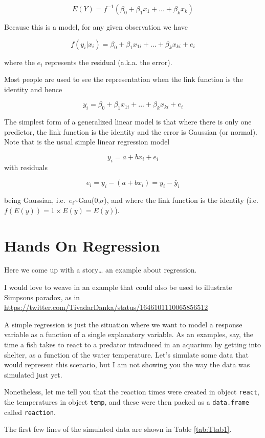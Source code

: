 \documentclass[
]{book}
\begin{document}
\[ E(Y) =  f^{-1}(\beta_0+\beta_1 x_1 + ... + \beta_k x_k) \]

Because this is a model, for any given observation we have

\[ f{(y_i|x_i)} =  \beta_0+\beta_1 x_{1i} + ... + \beta_k x_{ki} + e_i \]

where the \(e_i\) represents the residual (a.k.a. the error).

Most people are used to see the representation when the link function is the identity and hence

\[ y_i =  \beta_0+\beta_1 x_{1i} + ... + \beta_k x_{ki} + e_i \]

The simplest form of a generalized linear model is that where there is only one predictor, the link function is the identity and the error is Gaussian (or normal). Note that is the usual simple linear regression model

\[y_i=a+bx_i+e_i\]
with residuals

\[e_i=y_i - (a+bx_i)= y_i-\hat y_i\]

being Gaussian, i.e.~\(e_i\)\textasciitilde Gau(0,\(\sigma\)), and where the link function is the identity (i.e.~\(f(E(y))=1 \times E(y)=E(y)\)).

\chapter{Hands On Regression}\label{handson}

Here we come up with a story\ldots{} an example about regression.

I would love to weave in an example that could also be used to illustrate Simpsons paradox, as in \url{https://twitter.com/TivadarDanka/status/1646101110065856512}

A simple regression is just the situation where we want to model a response variable as a function of a single explanatory variable. As an examples, say, the time a fish takes to react to a predator introduced in an aquarium by getting into shelter, as a function of the water temperature. Let's simulate some data that would represent this scenario, but I am not showing you the way the data was simulated just yet.

Nonetheless, let me tell you that the reaction times were created in object \texttt{react}, the temperatures in object \texttt{temp}, and these were then packed as a \texttt{data.frame} called \texttt{reaction}.

The first few lines of the simulated data are shown in Table \ref{tab:Ttab1}.
\end{document}
